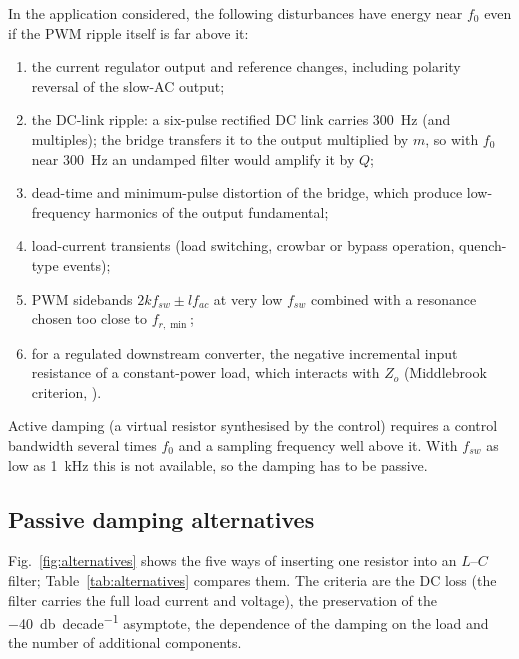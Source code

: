 \documentclass[11pt,a4paper]{article}
\begin{document}
In the application considered, the following disturbances have energy near $f_0$ even if
the PWM ripple itself is far above it:
\begin{enumerate}[nosep]
\item the current regulator output and reference changes, including polarity reversal of
      the slow-AC output;
\item the DC-link ripple: a six-pulse rectified DC link carries \SI{300}{\hertz} (and
      multiples); the bridge transfers it to the output multiplied by $m$, so with $f_0$
      near \SI{300}{\hertz} an undamped filter would amplify it by $Q$;
\item dead-time and minimum-pulse distortion of the bridge, which produce low-frequency
      harmonics of the output fundamental;
\item load-current transients (load switching, crowbar or bypass operation, quench-type
      events);
\item PWM sidebands $2 k f_{sw} \pm l f_{ac}$ at very low $f_{sw}$ combined with a
      resonance chosen too close to $f_{r,\min}$;
\item for a regulated downstream converter, the negative incremental input resistance
      of a constant-power load, which interacts with $Z_o$ (Middlebrook criterion,
      \cite{Middlebrook1976,Erich1992,Vlatkovic1996,Feng2002,Riccobono2014,Cespedes2011}).
\end{enumerate}
Active damping (a virtual resistor synthesised by the control) requires a control
bandwidth several times $f_0$ and a sampling frequency well above it. With $f_{sw}$ as
low as \SI{1}{\kilo\hertz} this is not available, so the damping has to be passive.

\subsection{Passive damping alternatives}

Fig.~\ref{fig:alternatives} shows the five ways of inserting one resistor into an $L$--$C$
filter; Table~\ref{tab:alternatives} compares them. The criteria are the DC loss (the
filter carries the full load current and voltage), the preservation of the
\SI{-40}{\decibel\per decade} asymptote, the dependence of the damping on the load and the
number of additional components.
\end{document}
